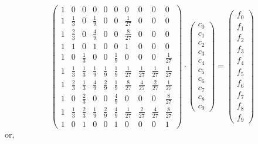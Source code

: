 \[
\left(
\begin{array}{cccccccccc}
1 & 0& 0&0&0&0&0&0&0&0 \\
1 & \frac13 & 0 & \frac19 &0 &0 & \frac{1}{27} & 0 & 0 & 0 \\
1 & \frac23 & 0 & \frac49 & 0 & 0 & \frac{8}{27} &0 &0 &0   \\
1 & 1 & 0 & 1 &0 & 0 &1 &0 &0 &0    \\
1 & 0 & \frac13 & 0 & 0 & \frac19 & 0& 0& 0 & \frac{1}{27}\\
1 & \frac13 & \frac13 & \frac19 & \frac19 & \frac19 & \frac{1}{27} & \frac{1}{27} & \frac{1}{27} & \frac{1}{27}    \\
1 & \frac23 & \frac13 & \frac49 & \frac29 & \frac19 
& \frac{8}{27}  & \frac{4}{27}  & \frac{2}{27}  & \frac{1}{27}    \\
1 & 0 & \frac23 & 0 & 0 & \frac49 & 0& 0& 0& \frac{8}{27}  \\
1 & \frac13 & \frac23 & \frac19 & \frac29 & \frac49 & \frac{1}{27} & \frac{2}{27} & \frac{4}{27} & \frac{8}{27}    \\
1 & 0 & 1 & 0 & 0 &1 & 0 & 0 & 0 & 1   
\end{array}
\right)
\cdot
\left(
\begin{array}{c}
c_0 \\ c_1 \\ c_2 \\ c_3 \\ c_4 \\ c_5 \\ c_6 \\ c_7 \\ c_8 \\ c_9
\end{array}
\right)
=
\left(
\begin{array}{c}
f_0 \\ f_1 \\ f_2 \\ f_3 \\ f_4 \\ f_5 \\ f_6 \\ f_7 \\ f_8 \\ f_9
\end{array}
\right)
\]
or, 
